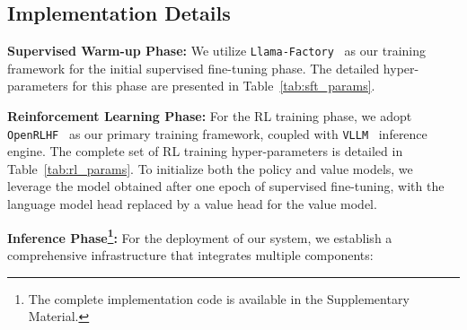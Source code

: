\subsection{Implementation Details}
\textbf{Supervised Warm-up Phase:} 
We utilize \texttt{Llama-Factory}~\citep{zheng2024llamafactory} as our training framework for the initial supervised fine-tuning phase. The detailed hyper-parameters for this phase are presented in Table~\ref{tab:sft_params}.


\textbf{Reinforcement Learning Phase:} 
For the RL training phase, we adopt \texttt{OpenRLHF}~\citep{hu2024openrlhf} as our primary training framework, coupled with \texttt{VLLM}~\citep{kwon2023efficient} inference engine. The complete set of RL training hyper-parameters is detailed in Table~\ref{tab:rl_params}. To initialize both the policy and value models, we leverage the model obtained after one epoch of supervised fine-tuning, with the language model head replaced by a value head for the value model.



\textbf{Inference Phase\footnote{The complete implementation code is available in the Supplementary Material.}:}
For the deployment of our system, we establish a comprehensive infrastructure that integrates multiple components:

